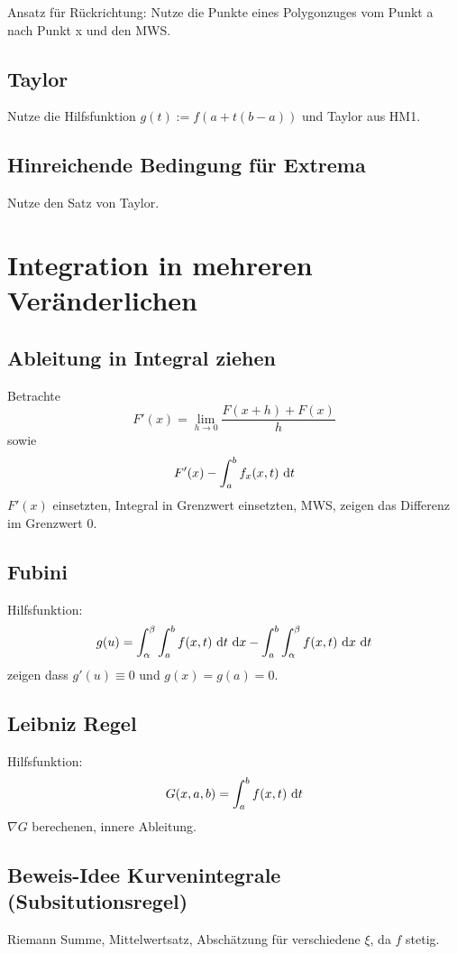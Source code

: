 Ansatz für Rückrichtung: Nutze die Punkte eines Polygonzuges vom Punkt a nach
Punkt x und den MWS.

\subsection{Taylor}
Nutze die Hilfsfunktion $g(t):=f(a+t(b-a))$ und Taylor aus HM1.

\subsection{Hinreichende Bedingung für Extrema}
Nutze den Satz von Taylor.



 \section{Integration in mehreren Veränderlichen}
 \subsection{Ableitung in Integral ziehen}
 Betrachte
 \begin{equation*}
     F'(x) = \lim_{h \to 0} \frac{F(x + h) + F(x)}{h}
 \end{equation*}
 sowie
 \begin{equation*}
     F'(x) - \int_a^b f_x(x,t) \text{ d}t
 \end{equation*}
 $F'(x)$ einsetzten, Integral in Grenzwert einsetzten, MWS,
 zeigen das Differenz im Grenzwert $0$.
 \subsection{Fubini}
 Hilfsfunktion:
 \begin{equation*}
     g(u) = \int_\alpha^\beta \int_a^b f(x,t) \text{ d}t \text{ d}x - \int_a^b \int_\alpha^\beta
     f(x,t) \text{ d}x \text{ d}t
 \end{equation*}
 zeigen dass $g'(u) \equiv 0$ und $g(x) = g(a) = 0$.

 \subsection{Leibniz Regel}
 Hilfsfunktion:
 \begin{equation*}
     G(x,a,b) = \int_a^b f(x,t) \text{ d}t
 \end{equation*}
 $\nabla G$ berechenen, innere Ableitung.

 \subsection{Beweis-Idee Kurvenintegrale (Subsitutionsregel)}
 Riemann Summe, Mittelwertsatz, Abschätzung für verschiedene $\xi$, da $f$ stetig.

